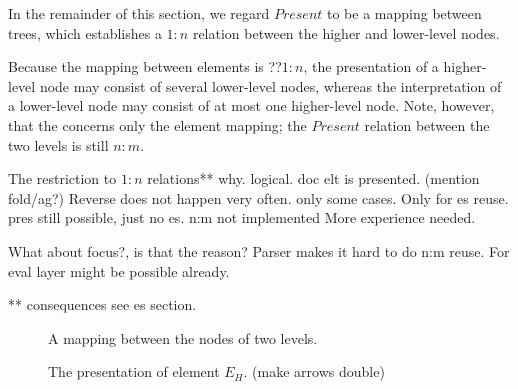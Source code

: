 In the remainder of this section, we regard $Present$ to be a mapping between trees, which establishes a $1:n$ relation between the higher and lower-level nodes. 

Because the mapping between elements is ??$1:n$, the presentation of a higher-level node may consist of several lower-level nodes, whereas the interpretation of a lower-level node may consist of at most one higher-level node. Note, however, that the concerns only the element mapping; the $Present$ relation between the two levels is still $n:m$.

The restriction to $1:n$ relations** why. logical. doc elt is presented. (mention fold/ag?) Reverse does not happen very often. only some cases. Only for es reuse. pres still possible, just no es. n:m not implemented More experience needed.

What about focus?, is that the reason?
Parser makes it hard to do n:m reuse. For eval layer might be possible already.

** consequences see es section.


\begin{figure}
\begin{center}
\begin{center}
\end{center}
\caption{A mapping between the nodes of two levels.}\label{nodeMapping} 
\end{center}
\end{figure}



%																

\begin{figure}
\begin{center}
\begin{center}
%                    
\end{center}
\caption{The presentation of element $E_H$. (make arrows double)}\label{elementPresentation} 
\end{center}
\end{figure}

